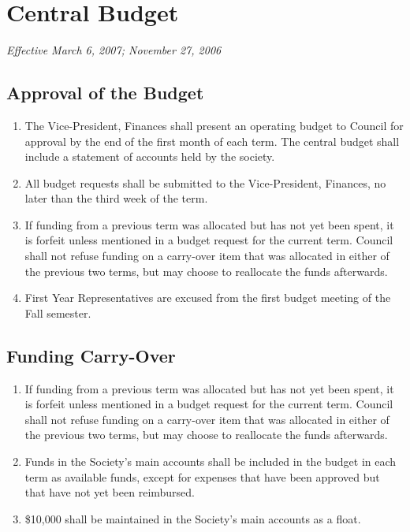 \section{Central Budget}
\emph{Effective March 6, 2007; November 27, 2006}\\

\subsection{Approval of the Budget}
\begin{enumerate}
    \item The Vice-President, Finances shall present an operating budget to
        Council for approval by the end of the first month of each term. The
        central budget shall include a statement of accounts held by the
        society.
    \item All budget requests shall be submitted to the Vice-President,
        Finances, no later than the third week of the term.
    \item If funding from a previous term was allocated but has not yet been
        spent, it is forfeit unless mentioned in a budget request for the
        current term.  Council shall not refuse funding on a carry-over item
        that was allocated in either of the previous two terms, but may choose
        to reallocate the funds afterwards.
    \item First Year Representatives are excused from the first budget meeting
        of the Fall semester.
\end{enumerate}

\subsection{Funding Carry-Over}
\begin{enumerate}
    \item If funding from a previous term was allocated but has not yet been
        spent, it is forfeit unless mentioned in a budget request for the
        current term. Council shall not refuse funding on a carry-over item
        that was allocated in either of the previous two terms, but may choose
        to reallocate the funds afterwards.
    \item Funds in the Society's main accounts shall be included in the budget
        in each term as available funds, except for expenses that have been
        approved but that have not yet been reimbursed.
    \item \$10,000 shall be maintained in the Society's main accounts as a
        float.
\end{enumerate}

